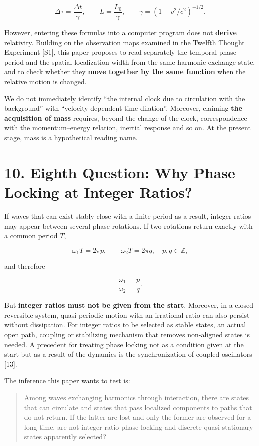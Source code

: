 \documentclass[
  a4paper,
]{article}
\begin{document}
\[
\Delta\tau=\frac{\Delta t}{\gamma},\qquad
L=\frac{L_0}{\gamma},\qquad
\gamma=(1-v^2/c^2)^{-1/2}.
\]

However, entering these formulas into a computer program does not
\textbf{derive} relativity. Building on the observation maps examined in
the Twelfth Thought Experiment {[}S1{]}, this paper proposes to read
separately the temporal phase period and the spatial localization width
from the same harmonic-exchange state, and to check whether they
\textbf{move together by the same function} when the relative motion is
changed.

We do not immediately identify ``the internal clock due to circulation
with the background'' with ``velocity-dependent time dilation''.
Moreover, claiming \textbf{the acquisition of mass} requires, beyond the
change of the clock, correspondence with the momentum--energy relation,
inertial response and so on. At the present stage, mass is a
hypothetical reading name.

\section{10. Eighth Question: Why Phase Locking at Integer
Ratios?}\label{eighth-question-why-phase-locking-at-integer-ratios}

If waves that can exist stably close with a finite period as a result,
integer ratios may appear between several phase rotations. If two
rotations return exactly with a common period \(T\),

\[
\omega_1T=2\pi p,\qquad
\omega_2T=2\pi q,
\quad p,q\in\mathbb Z,
\]

and therefore

\[
\frac{\omega_1}{\omega_2}=\frac pq.
\]

But \textbf{integer ratios must not be given from the start}. Moreover,
in a closed reversible system, quasi-periodic motion with an irrational
ratio can also persist without dissipation. For integer ratios to be
selected as stable states, an actual open path, coupling or stabilizing
mechanism that removes non-aligned states is needed. A precedent for
treating phase locking not as a condition given at the start but as a
result of the dynamics is the synchronization of coupled oscillators
{[}13{]}.

The inference this paper wants to test is:

\begin{quote}
Among waves exchanging harmonics through interaction, there are states
that can circulate and states that pass localized components to paths
that do not return. If the latter are lost and only the former are
observed for a long time, are not integer-ratio phase locking and
discrete quasi-stationary states apparently selected?
\end{quote}
\end{document}
